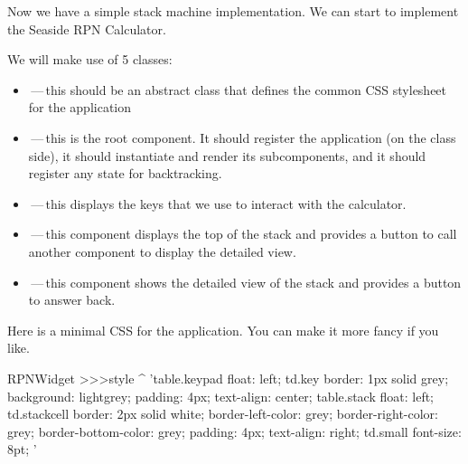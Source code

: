 \documentclass[a4paper,10pt,twoside]{book}
\begin{document}

Now we have a simple stack machine implementation.
We can start to implement the Seaside RPN Calculator.

We will make use of 5 classes:
\begin{itemize}
  \item {}\,---\,this should be an abstract class that defines the common CSS stylesheet for the application
  \item {}\,---\,this is the root component.
  It should register the application (on the class side), it should instantiate and render its subcomponents, and it should register any state for backtracking.
  \item {}\,---\,this displays the keys that we use to interact with the calculator.
  \item {}\,---\,this component displays the top of the stack and provides a button to call another component to display the detailed view.
  \item {}\,---\,this component shows the detailed view of the stack and provides a button to answer back.
\end{itemize}


Here is a minimal CSS for the application.
You can make it more fancy if you like.
\begin{code}{}
RPNWidget >>>style
	^ 'table.keypad { float: left; }
td.key {
	border: 1px solid grey;
	background: lightgrey;
	padding: 4px;
	text-align: center;
}
table.stack { float: left; }
td.stackcell {
	border: 2px solid white;
	border-left-color: grey;
	border-right-color: grey;
	border-bottom-color: grey;
	padding: 4px;
	text-align: right;
}
td.small { font-size: 8pt; }'
\end{code}


\end{document}
